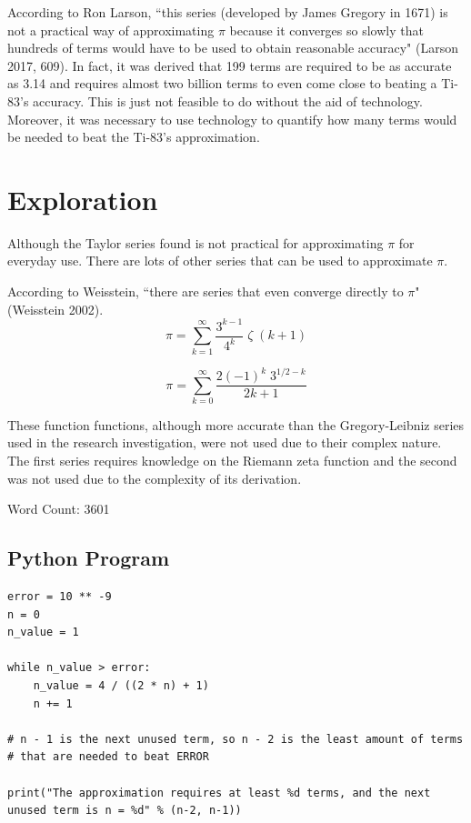 \documentclass[12pt, titlepage]{article}
\begin{document}
According to Ron Larson, ``this series (developed by James Gregory in 1671) is not a practical way of approximating \(\pi\) because it converges so slowly that hundreds of terms would have to be used to obtain reasonable accuracy" (Larson 2017, 609). In fact, it was derived that 199 terms are required to be as accurate as 3.14 and requires almost two billion terms to even come close to beating a Ti-83's accuracy. This is just not feasible to do without the aid of technology. Moreover, it was necessary to use technology to quantify how many terms would be needed to beat the Ti-83's approximation.

\section{Exploration}
Although the Taylor series found is not practical for approximating \(\pi\) for everyday use. There are lots of other series that can be used to approximate \(\pi\). 

According to Weisstein, ``there are series that even converge directly to \(\pi\)" (Weisstein 2002).
\begin{equation*}
    \pi = \sum_{k=1}^{\infty} \frac{3^{k-1}}{4^{k}} \; \zeta \;(k+1)
\end{equation*}

\begin{equation*}
    \pi = \sum_{k=0}^{\infty} \frac{2(-1)^{k} \; 3^{1/2-k}}{{2k+1}}
\end{equation*}

These function functions, although more accurate than the Gregory-Leibniz series used in the research investigation, were not used due to their complex nature. The first series requires knowledge on the Riemann zeta function and the second was not used due to the complexity of its derivation.

Word Count: 3601

\newpage
\begin{appendix}
\section{Python Program}
\begin{verbatim}
error = 10 ** -9
n = 0
n_value = 1

while n_value > error:
    n_value = 4 / ((2 * n) + 1)
    n += 1

# n - 1 is the next unused term, so n - 2 is the least amount of terms 
# that are needed to beat ERROR

print("The approximation requires at least %d terms, and the next
unused term is n = %d" % (n-2, n-1))
\end{verbatim}
\end{appendix}
\end{document}
